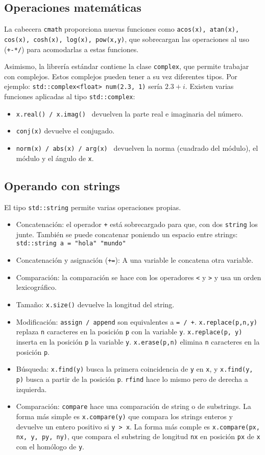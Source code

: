 \documentclass[a4paper]{article}
\begin{document}
	 \subsection{Operaciones matemáticas}
	 La cabecera \verb|cmath| proporciona nuevas funciones como \verb|acos(x), atan(x), cos(x), cosh(x), log(x), pow(x,y)|, que sobrecargan las operaciones al uso (\verb|+-*/|) para acomodarlas a estas funciones.
	 
	 Asimismo, la librería estándar contiene la clase \verb|complex|, que permite trabajar con complejos. Estos complejos pueden tener a su vez diferentes tipos. Por ejemplo: \verb|std::complex<float> num(2.3, 1)| sería $2.3 + i$. Existen varias funciones aplicadas al tipo \verb|std::complex|:
	 \begin{itemize}
	 	\item \verb|x.real() / x.imag() | devuelven la parte real e imaginaria del número.
	 	\item \verb|conj(x)| devuelve el conjugado.
	 	\item \verb|norm(x) / abs(x) / arg(x) | devuelven la norma (cuadrado del módulo), el módulo y el ángulo de \verb|x|.
	 \end{itemize}
	 
	 \subsection{Operando con strings}
	 El tipo \verb|std::string| permite varias operaciones propias.
	 \begin{itemize}
	 	\item Concatenación: el operador \verb|+| está sobrecargado para que, con dos \verb|string| los junte. También se puede concatenar poniendo un espacio entre strings: \verb|std::string a = "hola" "mundo"|
	 	\item Concatenación y asignación (\verb|+=|): A una variable le concatena otra variable. 
	 	\item Comparación: la comparación se hace con los operadores \verb|<| y \verb|>| y usa un orden lexicográfico.
	 	\item Tamaño: \verb|x.size()| devuelve la longitud del string.
	 	\item Modificación: \verb|assign / append| son equivalentes a \verb|= / +|. \verb|x.replace(p,n,y)| replaza \verb|n| caracteres en la posición \verb|p| con la variable \verb|y|. \verb|x.replace(p, y)| inserta en la posición \verb|p| la variable \verb|y|. \verb|x.erase(p,n)| elimina \verb|n| caracteres en la posición \verb|p|.
	 	\item Búsqueda: \verb|x.find(y)| busca la primera coincidencia de \verb|y| en \verb|x|, y \verb|x.find(y, p)| busca a partir de la posición \verb|p|. \verb|rfind| hace lo mismo pero de derecha a izquierda.
	 	\item Comparación: \verb|compare| hace una comparación de string o de substrings. La forma más simple es \verb|x.compare(y)| que compara los strings enteros y devuelve un entero positivo si \verb|y > x|. La forma más comple es \verb|x.compare(px, nx, y, py, ny)|, que compara el substring de longitud \verb|nx| en posición \verb|px| de \verb|x| con el homólogo de \verb|y|.
	 \end{itemize}
	 
\end{document}

